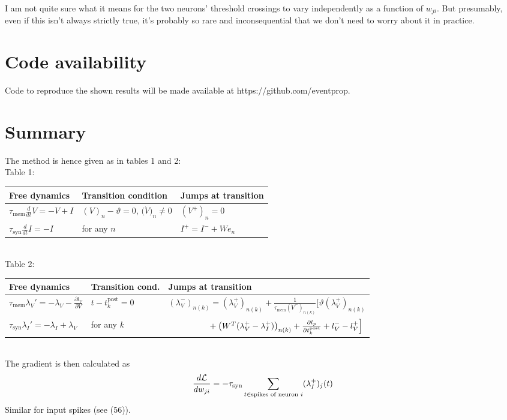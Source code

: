 \documentclass[a4paper]{article}
\newcommand{\blue}[1]{{\color{blue}#1}}
\begin{document}
I am not quite sure what it means for the two neurons' threshold
crossings to vary independently as a function of $w_{ji}$. But
presumably, even if this isn't always strictly true, it's probably so
rare and inconsequential that we don't need to worry about it in
practice.

\blue{
\section{Code availability}
Code to reproduce the shown results will be made available at https://github.com/eventprop.
}

\section{Summary}
The method is hence given as in tables 1 and 2: \\[0.2cm]
\noindent
Table 1: \\[0.2cm]
\noindent
\begin{tabular}{lll}
  \hline
  {\bf Free dynamics} & {\bf Transition condition} & {\bf Jumps at
    transition} \\
  \hline
$\tau_{\text{mem}} \frac{d}{dt} V = -V + I$ & $(V)_n - \vartheta = 0$,
  $\big(\dot{V}\big)_n \neq 0$ &
  $(V^+)_n = 0$ \\
  $\tau_{\text{syn}} \frac{d}{dt} I= -I$ & for any $n$ & $I^+= I^- + W
  e_n$ \\
  \hline
  \end{tabular}\\[0.5cm]
\noindent
Table 2: \\[0.2cm]
\noindent
\begin{tabular}{lll}
  \hline
  {\bf Free dynamics} & {\bf Transition cond.} & {\bf Jumps at
    transition} \\
  \hline
  $\tau_{\text{mem}} \lambda_V' = - \lambda_V - \frac{\partial
    l_V}{\partial V}$ & $t-t_k^{\text{post}} = 0$ &
  $(\lambda_V^-)_{n(k)} = (\lambda_V^+)_{n(k)} +
  \frac{1}{\tau_{\text{mem}} (\dot{V}^-)_{n(k)}} \Big[
      \vartheta (\lambda_V^+)_{n(k)}$ \\
      $\tau_{\text{syn}} \lambda_I' = -\lambda_I + \lambda_V$ & for
      any $k$ & $\hphantom{(\lambda_V^-)_{n(k)} = } + \left(W^T
      (\lambda_V^+ - \lambda_I^+)\right)_{n(k)} + \frac{\partial
        l_p}{\partial t_k^{\text{post}}} + l_V^- - l_V^+ \Big]$ \\
  \hline
\end{tabular} \\[0.5cm]
The gradient is then calculated as
\begin{align}
  \frac{d \cal L}{d w_{ji}} = - \tau_{\text{syn}} \sum_{t \in
    \text{spikes of neuron }
    i} (\lambda_I^+)_j (t) 
\end{align}
Similar for input spikes (see \blue{(56})).
\end{document}
